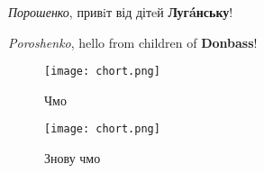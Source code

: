 \documentclass[16pt]{article}
\begin{document}
\begin{large}
    {\huge{\it Порошенко}, привiт від        дітeй {\bf Луг\'{a}нську}!}
\end{large}

    {\it Poroshenko}, hello from children of {\bf Donbass}!
\begin{figure}[h]
    \centering
    \texttt{[image: chort.png]}
    \caption{Чмо}
\end{figure}
\begin{figure}[h]
    \centering
    \texttt{[image: chort.png]}
    \caption{Знову чмо}
\end{figure}
\end{document}
